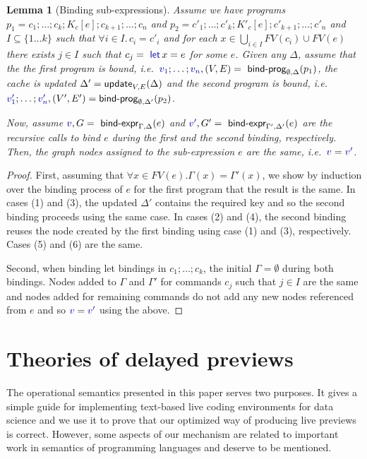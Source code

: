 \documentclass[english,submission]{programming}
\newcounter{thc}
\theoremstyle{plain}
\newtheorem{lem}[thc]{Lemma}
\theoremstyle{definition}
\newcommand{\ident}[1]{\textnormal{\textcolor{idclr}{\sffamily #1}}}
\newcommand{\kvd}[1]{\textnormal{\textcolor{kvdclr}{\sffamily #1}}}
\newcommand{\bndclr}[1]{\textcolor{kvdclr}{#1}}
\begin{document}
\begin{lem}[Binding sub-expressions]
\label{thm:sub-expr}
Assume we have programs $p_1 = c_1; \ldots; c_k; K_c[e]; c_{k+1};\ldots; c_n$ and
$p_2 = c'_1; \ldots; c'_k; K'_c[e]; c'_{k+1};\ldots;c'_n$ and $I\subseteq \{1\ldots k\}$ such
that $\forall i\!\in\!I.\,c_i\!=\!c'_i$ and for each $x \in \bigcup_{i\in I}FV(c_i) \cup FV(e)$
there exists $j\in I$ such that $c_j = \kvd{let}\,x=e$ for some $e$.
%
Given any $\Delta$, assume that the the first program is bound,
i.e.~$\bndclr{v_1};\ldots;\bndclr{v_n}, (V, E) = \ident{bind-prog}_{\emptyset, \Delta}(p_1)$,
the cache is updated $\Delta' = \ident{update}_{V, E}(\Delta)$ and the second
program is bound,
i.e.~$\bndclr{v'_1};\ldots;\bndclr{v'_n}, (V', E') = \ident{bind-prog}_{\emptyset, \Delta'}(p_2)$.

Now, assume $\bndclr{v}, G = \ident{bind-expr}_{\Gamma, \Delta}(e)$ and
$\bndclr{v'}, G' = \ident{bind-expr}_{\Gamma', \Delta'}(e)$ are the recursive calls to bind
$e$ during the first and the second binding, respectively. Then, the graph nodes assigned to the
sub-expression $e$ are the same, i.e.~$\bndclr{v} = \bndclr{v'}$.
\end{lem}
\begin{proof}
First, assuming that $\forall x\in FV(e). \Gamma(x) = \Gamma'(x)$, we show by induction over the binding process of $e$
for the first program that the result is the same. In cases (1) and (3), the updated $\Delta'$
contains the required key and so the second binding proceeds using the same case. In cases
(2) and (4), the second binding reuses the node created by the first binding using case (1) and
(3), respectively. Cases (5) and (6) are the same.

Second, when binding let bindings in $c_1; \ldots; c_k$, the initial $\Gamma = \emptyset$ during
both bindings. Nodes added to $\Gamma$ and $\Gamma'$ for commands $c_j$ such that $j\in I$ are
the same and nodes added for remaining commands do not add any new nodes referenced from $e$ and
so $\bndclr{v} = \bndclr{v'}$ using the above.
\end{proof}



\section{Theories of delayed previews}
\label{sec:app-theories}

The operational semantics presented in this paper serves two purposes. It gives a simple guide
for implementing text-based live coding environments for data science and we use it to prove that
our optimized way of producing live previews is correct. However, some aspects of our mechanism
are related to important work in semantics of programming languages and deserve to be mentioned.
\end{document}
